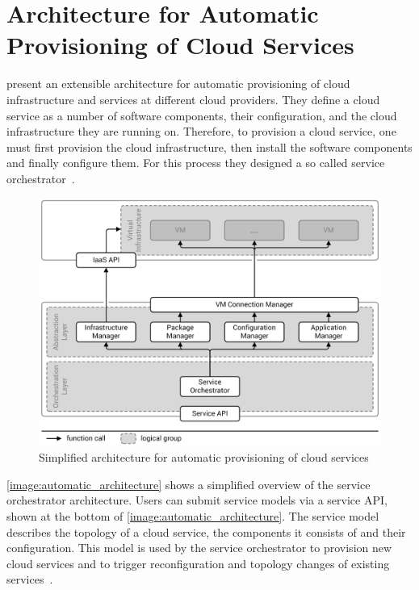 \section{Architecture for Automatic Provisioning of Cloud Services}
\label{related:architecture}

\citeauthor{provisioning:architecture} present an extensible architecture for automatic provisioning of cloud infrastructure and services at different cloud providers.
They define a cloud service as a number of software components, their configuration, and the cloud infrastructure they are running on.
Therefore, to provision a cloud service, one must first provision the cloud infrastructure, then install the software components and finally configure them.
For this process they designed a so called service orchestrator~\autocite{provisioning:architecture}.

\begin{figure}[!htbp]
	\centering
	\includegraphics[resolution=600]{related/assets/automatic_architecture}
	\caption{Simplified architecture for automatic provisioning of cloud services~\autocite[based on][]{provisioning:architecture}}
	\label{image:automatic_architecture}
\end{figure}

\autoref{image:automatic_architecture} shows a simplified overview of the service orchestrator architecture.
Users can submit service models via a service API, shown at the bottom of \autoref{image:automatic_architecture}.
The service model describes the topology of a cloud service, the components it consists of and their configuration.
This model is used by the service orchestrator to provision new cloud services and to trigger reconfiguration and topology changes of existing services~\autocite{provisioning:architecture}.

